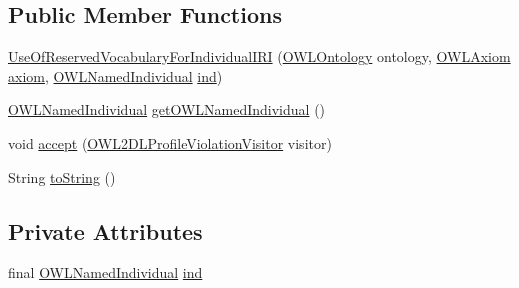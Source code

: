 \subsection*{Public Member Functions}
\begin{DoxyCompactItemize}
\item 
\hyperlink{classorg_1_1semanticweb_1_1owlapi_1_1profiles_1_1_use_of_reserved_vocabulary_for_individual_i_r_i_a698d6f1213e9fcee82bca9c890be96aa}{Use\-Of\-Reserved\-Vocabulary\-For\-Individual\-I\-R\-I} (\hyperlink{interfaceorg_1_1semanticweb_1_1owlapi_1_1model_1_1_o_w_l_ontology}{O\-W\-L\-Ontology} ontology, \hyperlink{interfaceorg_1_1semanticweb_1_1owlapi_1_1model_1_1_o_w_l_axiom}{O\-W\-L\-Axiom} \hyperlink{classorg_1_1semanticweb_1_1owlapi_1_1profiles_1_1_o_w_l_profile_violation_aa7c8e8910ed3966f64a2c003fb516214}{axiom}, \hyperlink{interfaceorg_1_1semanticweb_1_1owlapi_1_1model_1_1_o_w_l_named_individual}{O\-W\-L\-Named\-Individual} \hyperlink{classorg_1_1semanticweb_1_1owlapi_1_1profiles_1_1_use_of_reserved_vocabulary_for_individual_i_r_i_ab9cf5090904c7be32b9313f2b6656a92}{ind})
\item 
\hyperlink{interfaceorg_1_1semanticweb_1_1owlapi_1_1model_1_1_o_w_l_named_individual}{O\-W\-L\-Named\-Individual} \hyperlink{classorg_1_1semanticweb_1_1owlapi_1_1profiles_1_1_use_of_reserved_vocabulary_for_individual_i_r_i_a9f6b230d4440327d3a66c55379327e1e}{get\-O\-W\-L\-Named\-Individual} ()
\item 
void \hyperlink{classorg_1_1semanticweb_1_1owlapi_1_1profiles_1_1_use_of_reserved_vocabulary_for_individual_i_r_i_a350fb7086fc37328c926c67738331796}{accept} (\hyperlink{interfaceorg_1_1semanticweb_1_1owlapi_1_1profiles_1_1_o_w_l2_d_l_profile_violation_visitor}{O\-W\-L2\-D\-L\-Profile\-Violation\-Visitor} visitor)
\item 
String \hyperlink{classorg_1_1semanticweb_1_1owlapi_1_1profiles_1_1_use_of_reserved_vocabulary_for_individual_i_r_i_acd5be9c073050b868af482e1b92b1ea8}{to\-String} ()
\end{DoxyCompactItemize}
\subsection*{Private Attributes}
\begin{DoxyCompactItemize}
\item 
final \hyperlink{interfaceorg_1_1semanticweb_1_1owlapi_1_1model_1_1_o_w_l_named_individual}{O\-W\-L\-Named\-Individual} \hyperlink{classorg_1_1semanticweb_1_1owlapi_1_1profiles_1_1_use_of_reserved_vocabulary_for_individual_i_r_i_ab9cf5090904c7be32b9313f2b6656a92}{ind}
\end{DoxyCompactItemize}


